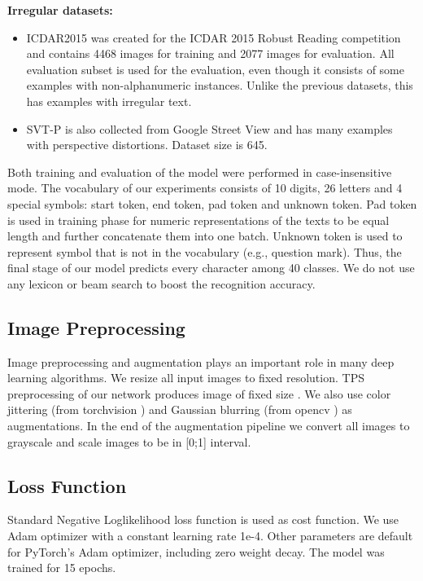 \documentclass[runningheads]{llncs}
\begin{document}
\textbf{Irregular datasets:}
\begin{itemize}
  \item ICDAR2015 \cite{icdar15} was created for the ICDAR 2015 Robust Reading competition
        and contains 4468 images for training and 2077 images for evaluation. All evaluation subset
        is used for the evaluation, even though it consists of some examples with non-alphanumeric
        instances. Unlike the previous datasets, this has examples with irregular text.
  \item SVT-P \cite{svtp} is also collected from Google Street View and has many examples with
        perspective distortions. Dataset size is 645.
\end{itemize}


Both training and evaluation of the model were performed in case-insensitive mode. The vocabulary
of our experiments consists of 10 digits, 26 letters and 4 special symbols: start token,
end token, pad token and unknown token. Pad token is used in training phase for numeric
representations of the texts to be equal length and further concatenate them into one batch.
Unknown token is used to represent symbol that is not in the vocabulary (e.g., question mark).
Thus, the final stage of our model predicts every character among 40 classes.
We do not use any lexicon or beam search to boost the recognition accuracy.

\subsection{Image Preprocessing}
Image preprocessing and augmentation plays an important role in many deep learning algorithms.
We resize all input images to  fixed resolution. TPS preprocessing of our network
produces image of fixed size . We also use color jittering (from torchvision
\cite{torchvision}) and Gaussian blurring (from opencv \cite{opencv_library}) as augmentations.
In the end of the augmentation pipeline we convert all images to grayscale and scale
images to be in [0;1] interval.

\subsection{Loss Function}
Standard Negative Loglikelihood loss function is used as cost function. We use Adam
\cite{kingma2017adam} optimizer with a constant learning rate 1e-4. Other parameters are
default for PyTorch's Adam optimizer, including zero weight decay.
The model was trained for 15 epochs.
\end{document}

